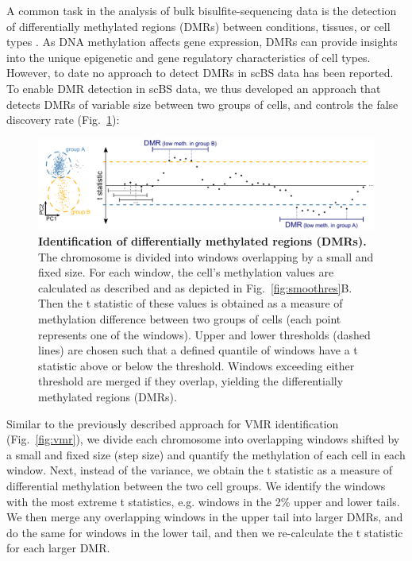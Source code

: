 \documentclass[twocolumn,10pt]{article}
\begin{document}
A common task in the analysis of bulk bisulfite-sequencing data is the detection of differentially methylated regions (DMRs) between conditions, tissues, or cell types \citep{Hebestreit2013, dmrseq}.
As DNA methylation affects gene expression, DMRs can provide insights into the unique epigenetic and gene regulatory characteristics of cell types.
However, to date no approach to detect DMRs in scBS data has been reported.
To enable DMR detection in scBS data, we thus developed an approach that detects DMRs of variable size between two groups of cells, and controls the false discovery rate (Fig.~\ref{fig:dmrscan}):

\begin{figure}
	\begin{center}
		\includegraphics[width=.75\textwidth]{figures/Fig_DMRdetection.png}
	\end{center}
	\caption{\small \textbf{Identification of differentially methylated regions (DMRs).}\\
		The chromosome is divided into windows overlapping by a small and fixed size.
		For each window, the cell’s methylation values are calculated as described and as depicted in Fig.~\ref{fig:smoothres}B.
		Then the t statistic of these values is obtained as a measure of methylation difference between two groups of cells (each point represents one of the windows).
		Upper and lower thresholds (dashed lines) are chosen such that a defined quantile of windows have a t statistic above or below the threshold.
		Windows exceeding either threshold are merged if they overlap, yielding the differentially methylated regions (DMRs).}
	\label{fig:dmrscan}
\end{figure}

Similar to the previously described approach for VMR identification (Fig.~\ref{fig:vmr}), we divide each chromosome into overlapping windows shifted by a small and fixed size (step size) and quantify the methylation of each cell in each window.
Next, instead of the variance, we obtain the t statistic %
as a measure of differential methylation between the two cell groups.
We identify the windows with the most extreme t statistics, e.g. windows in the 2\% upper and lower tails.
We then merge any overlapping windows in the upper tail into larger DMRs, and do the same for windows in the lower tail, and then we re-calculate the t statistic for each larger DMR.
\end{document}
